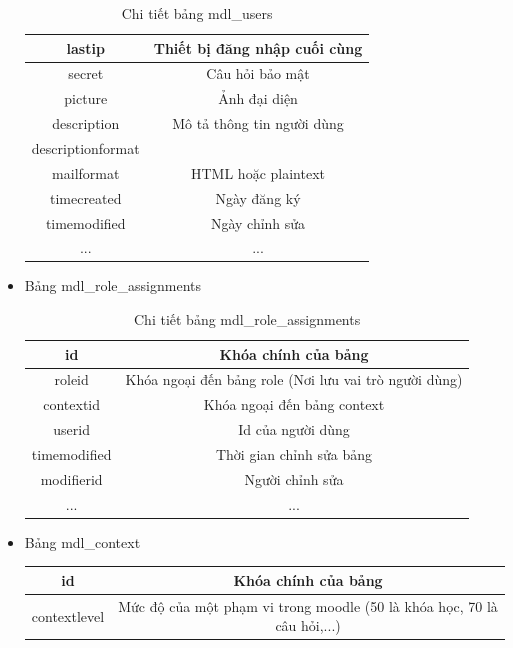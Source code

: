 \begin{itemize}
\begin{center}
\begin{table}[!htp]
\begin{tabular}{|c|c|}
				\hline 
				lastip & Thiết bị đăng nhập cuối cùng \\ 
				\hline 
				secret & Câu hỏi bảo mật \\ 
				\hline 
				picture & Ảnh đại diện \\
				\hline 
				description & Mô tả thông tin người dùng \\ 
				\hline 
				descriptionformat &  \\ 
				\hline 
				mailformat & HTML hoặc plaintext \\
				\hline 
				timecreated & Ngày đăng ký \\ 
				\hline 
				timemodified & Ngày chỉnh sửa \\
				\hline 
				... & ... \\
				\hline
			\end{tabular}
			\caption{Chi tiết bảng mdl\_users}
			\label{bang4}
		\end{table}
	\end{center}
	\newpage
	\item Bảng mdl\_role\_assignments
	\begin{center}
		\begin{table}[!htp]
			\centering
			\begin{tabular}{|c|c|}
				\hline 
				id & Khóa chính của bảng \\ 
				\hline 
				roleid & Khóa ngoại đến bảng role (Nơi lưu vai trò người dùng) \\ 
				\hline 
				contextid & Khóa ngoại đến bảng context \\ 
				\hline 
				userid & Id của người dùng \\ 
				\hline 
				timemodified & Thời gian chỉnh sửa bảng \\ 
				\hline 
				modifierid & Người chỉnh sửa \\ 
				\hline 
				... & ... \\
				\hline
			\end{tabular} 
			\caption{Chi tiết bảng mdl\_role\_assignments}
			\label{bang5}
		\end{table}
	\end{center}
	\item Bảng mdl\_context
	\begin{center}
		\begin{table}[!htp]
			\centering
			\begin{tabular}{|c|c|}
				\hline 
				id & Khóa chính của bảng \\ 
				\hline 
				contextlevel & Mức độ của một phạm vi trong moodle (50 là khóa học, 70 là câu hỏi,...) \\ 

\end{tabular}
\end{table}
\end{center}
\end{itemize}

